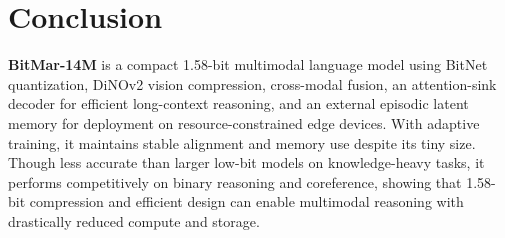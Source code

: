 \section{Conclusion}
\label{sec:conclusion}
\textbf{BitMar-14M} is a compact 1.58-bit multimodal language model using BitNet quantization, DiNOv2 vision compression, cross-modal fusion, an attention-sink decoder for efficient long-context reasoning, and an external episodic latent memory for deployment on resource-constrained edge devices. With adaptive training, it maintains stable alignment and memory use despite its tiny size. Though less accurate than larger low-bit models on knowledge-heavy tasks, it performs competitively on binary reasoning and coreference, showing that 1.58-bit compression and efficient design can enable multimodal reasoning with drastically reduced compute and storage.




